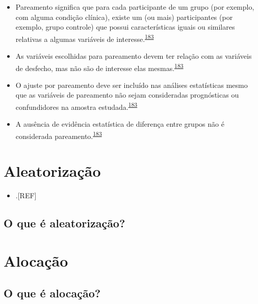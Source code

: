 \documentclass[
  a4paper,
]{book}
\providecommand{\tightlist}{%
  \setlength{\itemsep}{0pt}\setlength{\parskip}{0pt}}
\begin{document}
\begin{itemize}
\item
  Pareamento significa que para cada participante de um grupo (por exemplo, com alguma condição clínica), existe um (ou mais) participantes (por exemplo, grupo controle) que possui características iguais ou similares relativas a algumas variáveis de interesse.\textsuperscript{\protect\hyperlink{ref-Bland1994}{183}}
\item
  As variáveis escolhidas para pareamento devem ter relação com as variáveis de desfecho, mas não são de interesse elas mesmas.\textsuperscript{\protect\hyperlink{ref-Bland1994}{183}}
\item
  O ajuste por pareamento deve ser incluído nas análises estatísticas mesmo que as variáveis de pareamento não sejam consideradas prognósticas ou confundidores na amostra estudada.\textsuperscript{\protect\hyperlink{ref-Bland1994}{183}}
\item
  A ausência de evidência estatística de diferença entre grupos não é considerada pareamento.\textsuperscript{\protect\hyperlink{ref-Bland1994}{183}}
\end{itemize}

\hypertarget{aleatorizauxe7uxe3o}{%
\section{Aleatorização}\label{aleatorizauxe7uxe3o}}

\begin{itemize}
\tightlist
\item
  .{[}REF{]}
\end{itemize}

\hypertarget{o-que-uxe9-aleatorizauxe7uxe3o}{%
\subsection{O que é aleatorização?}\label{o-que-uxe9-aleatorizauxe7uxe3o}}

\hypertarget{alocacao}{%
\section{Alocação}\label{alocacao}}

\hypertarget{o-que-uxe9-alocauxe7uxe3o}{%
\subsection{O que é alocação?}\label{o-que-uxe9-alocauxe7uxe3o}}
\end{document}
